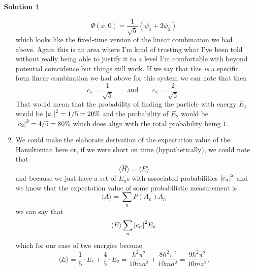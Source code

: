 \documentclass[10pt]{article}
\theoremstyle{definition}
\newtheorem{soln}{Solution}
\begin{document}
\begin{soln}
\begin{enumerate}[label=(\alph*)]
          $$\Psi(x,0)=\frac{1}{\sqrt{5}}\left(\psi_1+2\psi_2\right)$$
          which looks like the fixed-time version of the linear combination we had above.
          Again this is an area where I'm kind of trusting what I've been told without really
          being able to justify it to a level I'm comfortable with beyond potential coincidence
          but things still work. If we say that this \emph{is} a specific form linear combination we had above
          for this system we can note that then
          $$c_1=\frac{1}{\sqrt{5}}\qquad\text{and}\qquad c_2=\frac{2}{\sqrt{5}}.$$
          That would mean that the probability of finding the particle with energy $E_1$
          would be $\abs{c_1}^2=1/5=20\%$ and the probability of $E_2$ would be
          $\abs{c_2}^2=4/5=80\%$ which does align with the total probability being $1$.
    \item We could make the elaborate derivation of the expectation value of the Hamiltonian here
          or, if we were short on time (hypothetically), we could note that
          $$\langle \hat{H} \rangle=\langle E \rangle$$
          and because we just have a set of $E_n$s with associated probabilities $\abs{c_n}^2$
          and we know that the expectation value of some probabilistic measurement is
          $$\langle A\rangle=\sum_{n}P(A_n)A_n$$
          we can say that
          $$\langle E \rangle \sum_{n}\abs{c_n}^2E_n$$
          which for our case of two energies become
          $$\langle E \rangle =\frac{1}{5}\cdot E_1+\frac{4}{5}\cdot E_2=
            \frac{\hbar^2\pi^2}{10ma^2}+\frac{8\hbar^2\pi^2}{10ma^2}
            =\frac{9\hbar^2\pi^2}{10ma^2}.$$
  \end{enumerate}
\end{soln}
\end{document}
